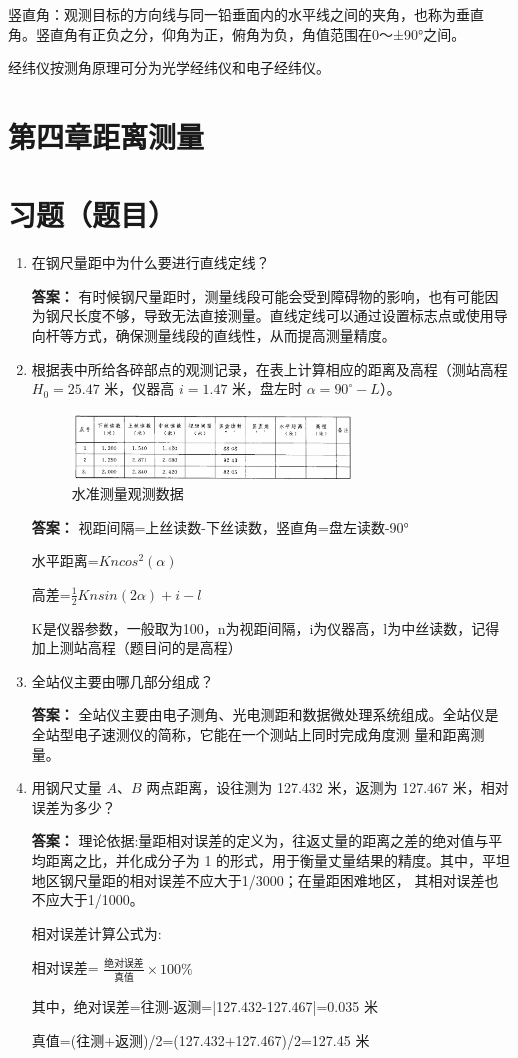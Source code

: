 \documentclass[12pt,a4paper]{article}
\newcounter{question}
\newenvironment{questions}{
    \setcounter{question}{0}
    \section*{习题（题目）}
    \begin{enumerate}[leftmargin=1.5em,label={\arabic*．}]
}{
    \end{enumerate}
}
\newcommand{\answer}[1]{\par\noindent\textbf{答案：} #1\par\vspace{1em}}
\begin{document}
竖直角：观测目标的方向线与同一铅垂面内的水平线之间的夹角，也称为垂直
角。竖直角有正负之分，仰角为正，俯角为负，角值范围在0～±90°之间。 

经纬仪按测角原理可分为{\color{red}光学经纬仪和电子经纬仪}。

\newpage

\section*{第四章\quad 距离测量}
\begin{questions}
    \item 在钢尺量距中为什么要进行直线定线？
    \answer{有时候钢尺量距时，测量线段可能会受到障碍物的影响，也有可能因为钢尺长度不够，导致无法直接测量。直线定线可以通过设置标志点或使用导向杆等方式，确保测量线段的直线性，从而提高测量精度。}
    \item 根据表中所给各碎部点的观测记录，在表上计算相应的距离及高程（测站高程 \( H_0 = 25.47 \) 米，仪器高 \( i = 1.47 \) 米，盘左时 \( \alpha = 90^\circ - L \)）。
    \begin{figure}[H]
        \centering
        \includegraphics[width = 0.7\textwidth]{./figures/3.png}
        \caption{水准测量观测数据}
    \end{figure}
    \answer{
        视距间隔=上丝读数-下丝读数，竖直角=盘左读数-90°

        水平距离=$Kncos^2(\alpha)$
    
        高差=$\frac{1}{2}Knsin(2\alpha) + i - l$
        
        K是仪器参数，一般取为100，n为视距间隔，i为仪器高，l为中丝读数，记得加上测站高程（题目问的是高程）
    }

    \item 全站仪主要由哪几部分组成？
    
    \answer{全站仪主要由电子测角、光电测距和数据微处理系统组成。全站仪是全站型电子速测仪的简称，它能在一个测站上同时完成角度测
量和距离测量。}

    \item 用钢尺丈量 \(A\)、\(B\) 两点距离，设往测为 127.432 米，返测为 127.467 米，相对误差为多少？
    \answer{
    理论依据:量距相对误差的定义为，往返丈量的距离之差的绝对值与平均距离之比，并化成分子为
1 的形式，用于衡量丈量结果的精度。其中，平坦地区钢尺量距的相对误差不应大于1/3000；在量距困难地区，
其相对误差也不应大于1/1000。

    相对误差计算公式为:
    
    相对误差= $\frac{\text{绝对误差}}{\text{真值}} \times 100\%$

    其中，绝对误差=往测-返测=|127.432-127.467|=0.035 米
    
    真值=(往测+返测)/2=(127.432+127.467)/2=127.45 米
    }
\end{questions}
\end{document}
